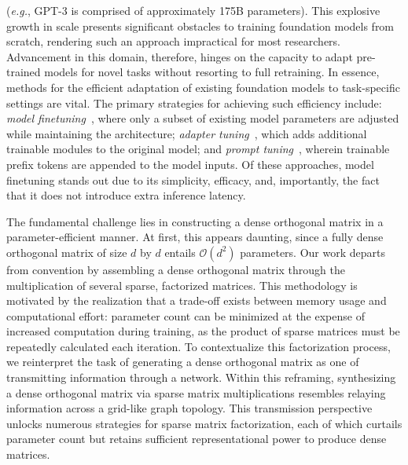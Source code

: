 (\emph{e.g.}, GPT-3 is comprised of approximately 175B parameters). This explosive growth in scale presents significant obstacles to training foundation models from scratch, rendering such an approach impractical for most researchers. Advancement in this domain, therefore, hinges on the capacity to adapt pre-trained models for novel tasks without resorting to full retraining. In essence, methods for the efficient adaptation of existing foundation models to task-specific settings are vital. The primary strategies for achieving such efficiency include: \emph{model finetuning}~\cite{hulora2022,zaken2022bitfit,guo2020parameter,raffel2020exploring,qiu2023controlling,zhang2022adaptive,chavan2023one}, where only a subset of existing model parameters are adjusted while maintaining the architecture; \emph{adapter tuning}~\cite{rebuffi2017learning,houlsby2019parameter,pfeiffer2020adapterfusion,lin2020exploring,he2021towards}, which adds additional trainable modules to the original model; and \emph{prompt tuning}~\cite{li2021prefix,lester2021power}, wherein trainable prefix tokens are appended to the model inputs. Of these approaches, model finetuning stands out due to its simplicity, efficacy, and, importantly, the fact that it does not introduce extra inference latency.

The fundamental challenge lies in constructing a dense orthogonal matrix in a parameter-efficient manner. At first, this appears daunting, since a fully dense orthogonal matrix of size $d$ by $d$ entails $\mathcal{O}(d^2)$ parameters. Our work departs from convention by assembling a dense orthogonal matrix through the multiplication of several sparse, factorized matrices. This methodology is motivated by the realization that a trade-off exists between memory usage and computational effort: parameter count can be minimized at the expense of increased computation during training, as the product of sparse matrices must be repeatedly calculated each iteration. To contextualize this factorization process, we reinterpret the task of generating a dense orthogonal matrix as one of transmitting information through a network. Within this reframing, synthesizing a dense orthogonal matrix via sparse matrix multiplications resembles relaying information across a grid-like graph topology. This transmission perspective unlocks numerous strategies for sparse matrix factorization, each of which curtails parameter count but retains sufficient representational power to produce dense matrices.

